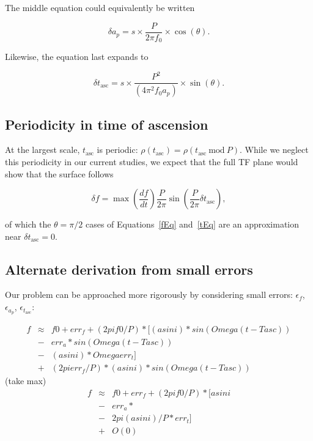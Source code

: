 \documentclass{article}
\begin{document}
\noindent The middle equation could equivalently be written

\begin{equation}
\delta a_p= s \times \frac{P}{2 \pi f_0} \times \cos(\theta).
\end{equation}

Likewise, the equation last expands to

\begin{equation}
\delta t_\mathrm{asc}    = s \times \frac{P^2}{(4 \pi^2 f_0 a_p)} \times \sin(\theta).
\end{equation}

\subsection{Periodicity in time of ascension}



At the largest scale, $t_\mathrm{asc}$ is periodic: $\rho(t_\mathrm{asc}) = \rho(t_\mathrm{asc} \mathrm{~mod~} P)$.
While we neglect this periodicity in our current studies, we expect that the full TF plane would show that the surface follows

\begin{equation}
\delta f = \max \left(\frac{df}{dt} \right) \frac{P}{2 \pi} \sin \left(\frac{P}{2 \pi} \delta t_\mathrm{asc} \right),
\end{equation}

\noindent of which the $\theta = \pi/2$ cases of Equations~\ref{fEq} and~\ref{tEq} are an approximation near $\delta t_\mathrm{asc} =0$.

\subsection{Alternate derivation from small errors}

Our problem can be approached more rigorously by considering small errors: $\epsilon_f$, $\epsilon_{a_p}$, $\epsilon_{t_\mathrm{asc}}$:

\begin{eqnarray}
f &\approx& f0 + err_f + (2pi f0/P)*[
                     (a sin i)*sin(Omega(t-Tasc)) \\
                   &-& err_a * sin(Omega(t-Tasc)) \\
                   &-& (a sin i) * Omega err_t] \\
                   &+& (2pi err_f/P)*(a sin i)*sin(Omega(t-Tasc))
\end{eqnarray}
  (take max)
\begin{eqnarray}
f &\approx& f0 + err_f + (2pi f0/P)*[
                     a sin i \\ 
                   &-& err_a * \\
                   &-& 2 pi (a sin i)/P * err_t] \\
                   &+& O(0)
\end{eqnarray}
\end{document}
